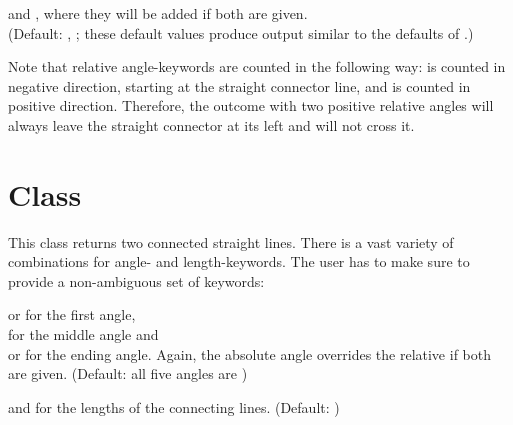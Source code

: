  and , where they will be added if both are
given.\\ (Default: , ; these default
values produce output similar to the defaults of .)\medskip

Note that relative angle-keywords are counted in the following way:
 is counted in negative direction, starting at the straight
connector line, and  is counted in positive direction.
Therefore, the outcome with two positive relative angles will always leave the
straight connector at its left and will not cross it.

\section{Class }

This class returns two connected straight lines. There is a vast variety of
combinations for angle- and length-keywords. The user has to make sure to
provide a non-ambiguous set of keywords:\medskip

 or  for the first angle,\\
 for the middle angle and\\
 or  for the ending angle.
Again, the absolute angle overrides the relative if both are given. (Default:
all five angles are )\medskip

 and  for the lengths of the connecting lines.
(Default: )


